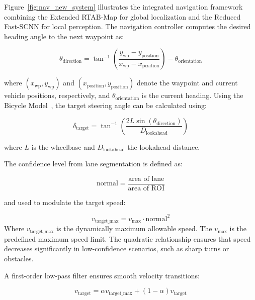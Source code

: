 \documentclass[conference, a4paper]{IEEEtran}[2015/08/26]
\begin{document}
Figure~\ref{fig:nav_new_system} illustrates the integrated navigation framework combining the Extended RTAB-Map for global localization and the Reduced Fast-SCNN for local perception. The navigation controller computes the desired heading angle to the next waypoint as:

\begin{equation}
	\theta_{\text{direction}} = \tan^{-1}\!\left(\frac{y_{\text{wp}} - y_{\text{position}}}{x_{\text{wp}} - x_{\text{position}}}\right) - \theta_{\text{orientation}}
	\label{eq:waypoint_angle}
\end{equation}

where $(x_{\text{wp}}, y_{\text{wp}})$ and $(x_{\text{position}}, y_{\text{position}})$ denote the waypoint and current vehicle positions, respectively, and $\theta_{\text{orientation}}$ is the current heading. Using the Bicycle Model~\cite{rajamani2011vehicle}, the target steering angle can be calculated using:

\begin{equation}
	\delta_{\text{target}} = \tan^{-1}\!\left( \frac{2L \sin(\theta_{\text{direction}})}{D_{\text{lookahead}}} \right)
	\label{eq:bicycle_model_full}
\end{equation}

where $L$ is the wheelbase and $D_{\text{lookahead}}$ the lookahead distance.

\par
The confidence level from lane segmentation is defined as:

\begin{equation}
	\text{normal} = \frac{\text{area of lane}}{\text{area of ROI}}
	\label{eq:confidence_level}
\end{equation}

and used to modulate the target speed:

\begin{equation}
	v_{\text{target\_max}} = v_{\text{max}} \cdot \text{normal}^2
	\label{eq:confidence_speed}
\end{equation}
Where $v_{\text{target\_max}}$ is the dynamically maximum allowable speed. The $v_{\text{max}}$ is the predefined maximum speed limit. The quadratic relationship ensures that speed decreases significantly in low-confidence scenarios, such as sharp turns or obstacles.

A first-order low-pass filter ensures smooth velocity transitions:

\begin{equation}
	v_{\text{target}} = \alpha v_{\text{target\_max}} + (1-\alpha)v_{\text{target}}
	\label{eq:low_pass_filter}
\end{equation}
\end{document}
